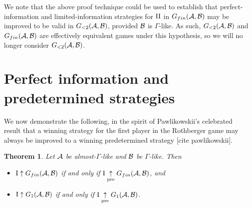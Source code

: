 \documentclass{amsart}
\theoremstyle{plain}
\newtheorem{theorem}{Theorem}
\theoremstyle{definition}
\theoremstyle{remark}
\theoremstyle{plain}
\theoremstyle{definition}
\theoremstyle{remark}
\begin{document}
We note that the above proof technique could be
used to establish that perfect-information and
limited-information strategies for \(\mathrm{II}\) in
\(G_{fin}(\mathcal{A},\mathcal{B})\) may be improved to
be valid in \(G_{<2}(\mathcal{A},\mathcal{B})\), provided
\(\mathcal{B}\) is \(\Gamma\)-like. As such,
\(G_{<2}(\mathcal{A},\mathcal{B})\) and \(G_{fin}(\mathcal{A},\mathcal{B})\)
are effectively equivalent games under this hypothesis,
so we will no longer consider \(G_{<2}(\mathcal{A},\mathcal{B})\).

\section{Perfect information and predetermined strategies}

We now demonstrate the following, in the spirit of Pawlikowskii's celebrated
result that a winning strategy for the first player in the Rothberger game
may always be improved to a winning predetermined strategy [cite pawlikowskii].

\begin{theorem}\label{pawlikowskii}
Let \(\mathcal{A}\) be almost-\(\Gamma\)-like and \(\mathcal{B}\) be \(\Gamma\)-like. Then
\begin{itemize}
\item \(\mathrm{I}\uparrow G_{fin}(\mathcal{A},\mathcal{B})\) if and only if
\(\mathrm{I}\underset{\text{pre}}{\uparrow} G_{fin}(\mathcal{A},\mathcal{B})\), and
\item \(\mathrm{I}\uparrow G_1(\mathcal{A},\mathcal{B})\) if and only if
\(\mathrm{I}\underset{\text{pre}}{\uparrow} G_1(\mathcal{A},\mathcal{B})\).
\end{itemize}
\end{theorem}
\end{document}
